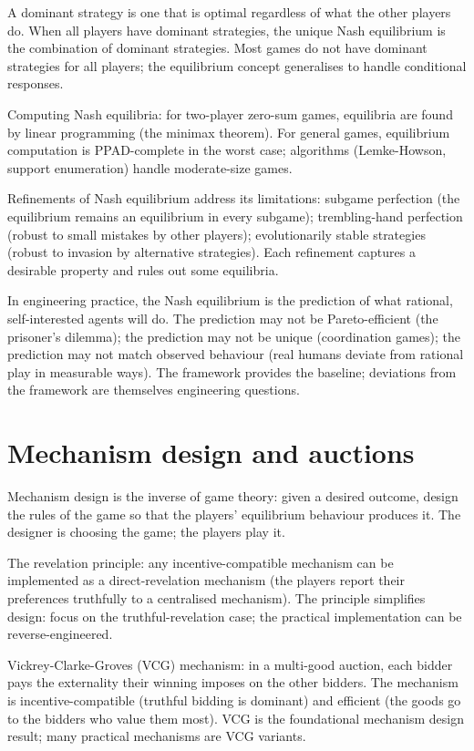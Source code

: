 A dominant strategy is one that is optimal regardless of what the other players do. When all players have dominant strategies, the unique Nash equilibrium is the combination of dominant strategies. Most games do not have dominant strategies for all players; the equilibrium concept generalises to handle conditional responses.

Computing Nash equilibria: for two-player zero-sum games, equilibria are found by linear programming (the minimax theorem). For general games, equilibrium computation is PPAD-complete in the worst case; algorithms (Lemke-Howson, support enumeration) handle moderate-size games.

Refinements of Nash equilibrium address its limitations: subgame perfection (the equilibrium remains an equilibrium in every subgame); trembling-hand perfection (robust to small mistakes by other players); evolutionarily stable strategies (robust to invasion by alternative strategies). Each refinement captures a desirable property and rules out some equilibria.

In engineering practice, the Nash equilibrium is the prediction of what rational, self-interested agents will do. The prediction may not be Pareto-efficient (the prisoner's dilemma); the prediction may not be unique (coordination games); the prediction may not match observed behaviour (real humans deviate from rational play in measurable ways). The framework provides the baseline; deviations from the framework are themselves engineering questions.

\section{Mechanism design and auctions}

Mechanism design is the inverse of game theory: given a desired outcome, design the rules of the game so that the players' equilibrium behaviour produces it. The designer is choosing the game; the players play it.

The revelation principle: any incentive-compatible mechanism can be implemented as a direct-revelation mechanism (the players report their preferences truthfully to a centralised mechanism). The principle simplifies design: focus on the truthful-revelation case; the practical implementation can be reverse-engineered.

Vickrey-Clarke-Groves (VCG) mechanism: in a multi-good auction, each bidder pays the externality their winning imposes on the other bidders. The mechanism is incentive-compatible (truthful bidding is dominant) and efficient (the goods go to the bidders who value them most). VCG is the foundational mechanism design result; many practical mechanisms are VCG variants.

